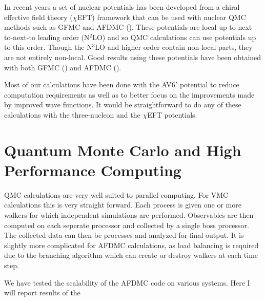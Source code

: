 In recent years a set of nuclear potentials has been developed from a chiral effective field theory ($\chi$EFT) framework that can be used with nuclear QMC methods such as GFMC and AFDMC (\cite{epelbaum2009,machleidt2011}). These potentials are local up to next-to-next-to leading order (N$^2$LO) and so QMC calculations can use potentials up to this order. Though the N$^3$LO and higher order contain non-local parts, they are not entirely non-local. Good results using these potentials have been obtained with both GFMC (\cite{lynn2014}) and AFDMC (\cite{lonardoni2018}).

Most of our calculations have been done with the AV6$'$ potential to reduce computation requirements as well as to better focus on the improvements made by improved wave functions. It would be straightforward to do any of these calculations with the three-nucleon and the $\chi$EFT potentials.

\section{Quantum Monte Carlo and High Performance Computing}
QMC calculations are very well suited to parallel computing. For VMC calculations this is very straight forward. Each process is given one or more walkers for which independent simulations are performed. Observables are then computed on each seperate processor and collected by a single boss processor. The collected data can then be processes and analyzed for final output. It is slightly more complicated for AFDMC calculations, as load balancing is required due to the branching algorithm which can create or destroy walkers at each time step.

We have tested the scalability of the AFDMC code on various systems. Here I will report results of the 

